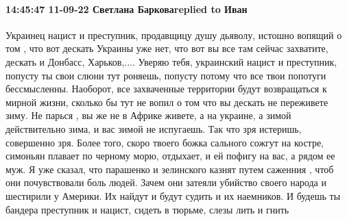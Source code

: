  
 
 
 
 

\paragraph{14:45:47 11-09-22 Светлана Барковаreplied to Иван}

Украинец нацист и преступник, продавщицу душу дьяволу, истошно вопящий о том ,
что вот дескать Украины уже нет, что вот вы все там сейчас захватите, дескать и
Донбасс, Харьков,.... Уверяю тебя, украинский нацист и преступник, попусту ты
свои слюни тут роняешь, попусту потому что все твои попотуги бессмысленны.
Наоборот, все захваченные территории будут возвращаться к мирной жизни, сколько
бы тут не вопил о том что вы дескать не переживете зиму. Не парься , вы же не в
Африке живете, а на украине, а зимой действительно зима, и вас зимой не
испугаешь. Так что зря истеришь, совершенно зря. Более того, скоро твоего божка
сального сожгут на костре, симоньян плавает по черному морю, отдыхает, и ей
пофигу на вас, а рядом ее муж. Я уже сказал, что парашенко и зелинского казнят
путем саженния , чтоб они почувствовали боль людей. Зачем они затеяли убийство
своего народа и шестирили у Америки. Их найдут и будут судить и их наемников. И
будешь ты бандера преступник и нацист, сидеть в тюрьме, слезы лить и гнить
